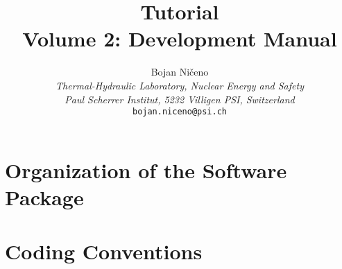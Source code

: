 \documentclass[a4paper]{book}
\begin{document}
  \title{ {\Huge {\bfseries\psiboil} {\bf Tutorial}} \\
           \vspace{10mm}
          {\huge {\bf Volume 2: Development Manual} } }

  \author{{\Large Bojan Ni\v{c}eno}                                     \\
          {\em Thermal-Hydraulic Laboratory, Nuclear Energy and Safety} \\
          {\em Paul Scherrer Institut, 5232 Villigen PSI, Switzerland}  \\
          {\tt bojan.niceno@psi.ch}}

  \maketitle

  \clearemptydoublepage


  \tableofcontents

  \clearemptydoublepage


  \chapter{Organization of the {\psiboil} Software Package}
  
  

  \chapter{Coding Conventions}
  
  
  
  
  

\end{document}
